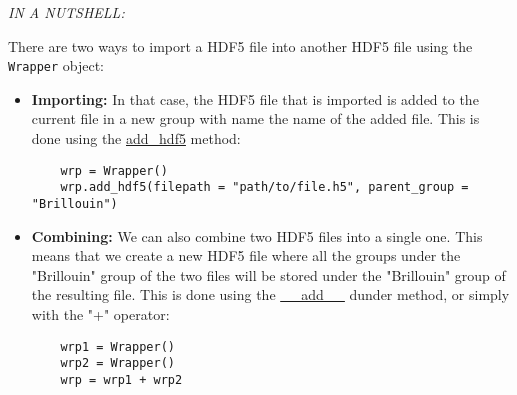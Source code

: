 \begin{tcolorbox}
    \textit{IN A NUTSHELL:}

    There are two ways to import a HDF5 file into another HDF5 file using the \texttt{Wrapper} object:
    \begin{itemize}
        \item \textbf{Importing:} In that case, the HDF5 file that is imported is added to the current file in a new group with name the name of the added file. This is done using the \hyperref[subsec:wrapper.add_hdf5]{add\_hdf5} method:
\begin{lstlisting}
    wrp = Wrapper()
    wrp.add_hdf5(filepath = "path/to/file.h5", parent_group = "Brillouin")
\end{lstlisting}
        \item \textbf{Combining:} We can also combine two HDF5 files into a single one. This means that we create a new HDF5 file where all the groups under the "Brillouin" group of the two files will be stored under the "Brillouin" group of the resulting file. This is done using the \hyperref[subsec:wrapper.__add__]{\_\_add\_\_} dunder method, or simply with the "+" operator:
\begin{lstlisting}
    wrp1 = Wrapper()
    wrp2 = Wrapper()
    wrp = wrp1 + wrp2
\end{lstlisting}
    \end{itemize}
\end{tcolorbox}
    
